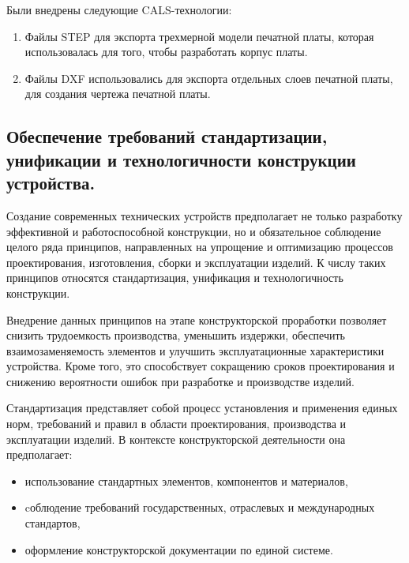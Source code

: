 Были внедрены следующие CALS-технологии:
\begin{enumerate}
\item Файлы STEP для экспорта трехмерной модели печатной
платы, которая использовалась для того, чтобы разработать корпус
платы.

\item Файлы DXF использовались для экспорта отдельных слоев
печатной платы, для создания чертежа печатной платы.
\end{enumerate}


\subsection{Обеспечение требований стандартизации, 
  унификации и технологичности конструкции устройства.}


Создание современных технических устройств предполагает не только
разработку эффективной и работоспособной конструкции, но и
обязательное соблюдение целого ряда принципов, направленных на
упрощение и оптимизацию процессов проектирования, изготовления, сборки
и эксплуатации изделий. К числу таких принципов относятся
стандартизация, унификация и технологичность конструкции.

Внедрение данных принципов на этапе конструкторской проработки
позволяет снизить трудоемкость производства, уменьшить издержки,
обеспечить взаимозаменяемость элементов и улучшить эксплуатационные
характеристики устройства. Кроме того, это способствует сокращению
сроков проектирования и снижению вероятности ошибок при разработке и
производстве изделий.

Стандартизация представляет собой процесс установления и применения
единых норм, требований и правил в области проектирования,
производства и эксплуатации изделий. В контексте конструкторской
деятельности она предполагает:

\begin{itemize}
\item использование стандартных элементов, компонентов и материалов,
\item cоблюдение требований государственных,
  отраслевых и международных стандартов,
\item  оформление конструкторской документации по единой системе.
\end{itemize}

